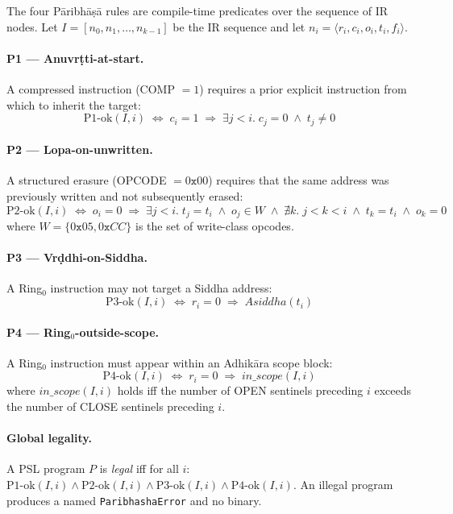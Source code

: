 \documentclass[11pt,a4paper]{article}
\begin{document}
The four P\={a}ribh\={a}\d{s}\={a} rules are compile-time predicates over
the sequence of IR nodes. Let $I = [n_0, n_1, \ldots, n_{k-1}]$ be the IR
sequence and let $n_i = \langle r_i, c_i, o_i, t_i, f_i \rangle$.

\paragraph{P1 --- Anuvr\d{t}ti-at-start.}
A compressed instruction (COMP $= 1$) requires a prior explicit instruction
from which to inherit the target:
\[
  \text{P1-ok}(I, i) \;\Leftrightarrow\;
  c_i = 1 \;\Rightarrow\; \exists j < i.\; c_j = 0 \;\wedge\; t_j \neq 0
\]

\paragraph{P2 --- Lopa-on-unwritten.}
A structured erasure (OPCODE $= 0\texttt{x}00$) requires that the same
address was previously written and not subsequently erased:
\[
  \text{P2-ok}(I, i) \;\Leftrightarrow\;
  o_i = 0 \;\Rightarrow\; \exists j < i.\; t_j = t_i \;\wedge\; o_j \in W
  \;\wedge\; \nexists k.\; j < k < i \;\wedge\; t_k = t_i \;\wedge\; o_k = 0
\]
where $W = \{0\texttt{x}05, 0\texttt{x}CC\}$ is the set of write-class opcodes.

\paragraph{P3 --- Vr\d{d}dhi-on-Siddha.}
A Ring$_0$ instruction may not target a Siddha address:
\[
  \text{P3-ok}(I, i) \;\Leftrightarrow\;
  r_i = 0 \;\Rightarrow\; \mathit{Asiddha}(t_i)
\]

\paragraph{P4 --- Ring$_0$-outside-scope.}
A Ring$_0$ instruction must appear within an Adhi\-k\={a}ra scope block:
\[
  \text{P4-ok}(I, i) \;\Leftrightarrow\;
  r_i = 0 \;\Rightarrow\; \mathit{in\_scope}(I, i)
\]
where $\mathit{in\_scope}(I, i)$ holds iff the number of OPEN sentinels
preceding $i$ exceeds the number of CLOSE sentinels preceding $i$.

\paragraph{Global legality.}
A PSL program $P$ is \emph{legal} iff for all $i$:
$\text{P1-ok}(I, i) \wedge \text{P2-ok}(I, i) \wedge
 \text{P3-ok}(I, i) \wedge \text{P4-ok}(I, i)$.
An illegal program produces a named \texttt{ParibhashaError} and no binary.
\end{document}
